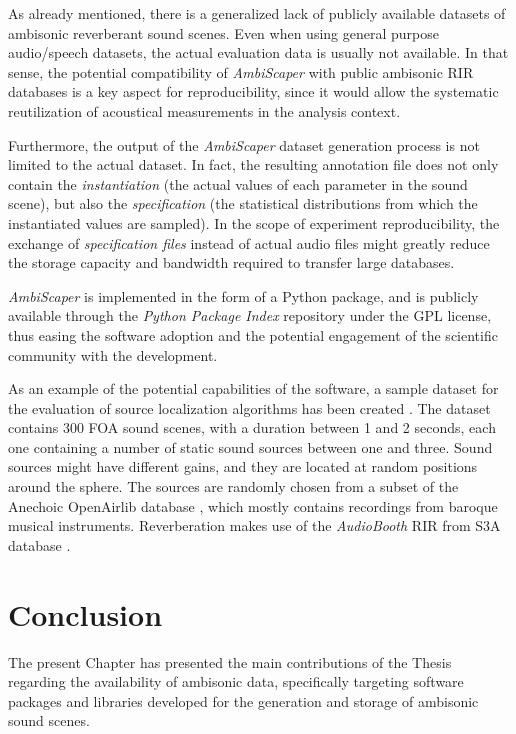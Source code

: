 As already mentioned, there is a generalized lack of publicly available datasets of ambisonic reverberant sound scenes. 
Even when using general purpose audio/speech datasets, the actual evaluation data is usually not available.
In that sense, the potential compatibility of \textit{AmbiScaper} with public ambisonic RIR databases is a key aspect for reproducibility, since it would allow the systematic reutilization of acoustical measurements in the analysis context.

Furthermore, the output of the \textit{AmbiScaper} dataset generation process is not limited to the actual dataset. 
In fact, the resulting annotation file does not only contain the \textit{instantiation} (the actual values of each parameter in the sound scene), but also the \textit{specification} (the statistical distributions from which the instantiated values are sampled). 
In the scope of experiment reproducibility, the exchange of \textit{specification files} instead of actual audio files might greatly reduce the storage capacity and bandwidth required to transfer large databases. 

\textit{AmbiScaper} is implemented in the form of a Python package, and is publicly available through the \textit{Python Package Index} repository  under the GPL license, thus easing the software adoption and the potential engagement of the scientific community with the development. 

As an example of the potential capabilities of the software, a sample dataset for the evaluation of source localization algorithms has been created \cite{ambiscaperDataset}.
The dataset contains 300 FOA sound scenes, with a duration between 1 and 2 seconds, each one containing a number of static sound sources between one and three.
Sound sources might have different gains, and they are located at random positions around the sphere. 
The sources are randomly chosen from a subset of the Anechoic OpenAirlib database \cite{openair}, which mostly contains recordings from baroque musical instruments.
Reverberation makes use of the \textit{AudioBooth} RIR from S3A database \cite{coleman2015s3a}.\\


\section{Conclusion}

The present Chapter has presented the main contributions of the Thesis regarding the availability of ambisonic data, specifically targeting software packages and libraries developed for the generation and storage of ambisonic sound scenes.

